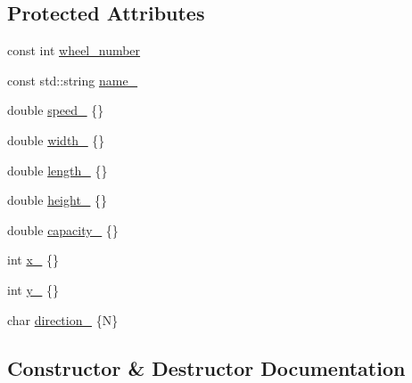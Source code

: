 \subsection*{Protected Attributes}
\begin{DoxyCompactItemize}
\item 
const int \hyperlink{classfp_1_1_land_based_wheeled_ac93d4b44f9091f566ec886ddb9972810}{wheel\+\_\+number}
\item 
const std\+::string \hyperlink{classfp_1_1_land_based_wheeled_a72094d60b6dbfa33b6e5cab4a8e5f7c4}{name\+\_\+}
\item 
double \hyperlink{classfp_1_1_land_based_wheeled_a65bfb90a4e7fe10c87f30d276d9db80c}{speed\+\_\+} \{\}
\item 
double \hyperlink{classfp_1_1_land_based_wheeled_ab36bf6c7c4d986d6e88982b224e1ad1a}{width\+\_\+} \{\}
\item 
double \hyperlink{classfp_1_1_land_based_wheeled_addf50162ea822bf0484978cc08afd07a}{length\+\_\+} \{\}
\item 
double \hyperlink{classfp_1_1_land_based_wheeled_a2a5ae9e9307a22c9538f51ab366d7f57}{height\+\_\+} \{\}
\item 
double \hyperlink{classfp_1_1_land_based_wheeled_abf13221333a556a215b951d45568f03a}{capacity\+\_\+} \{\}
\item 
int \hyperlink{classfp_1_1_land_based_wheeled_a575a73a2601f480d2edbc5daa4cc5bf1}{x\+\_\+} \{\}
\item 
int \hyperlink{classfp_1_1_land_based_wheeled_a5b66ada6988a2b8ce6efafa971dfd9c6}{y\+\_\+} \{\}
\item 
char \hyperlink{classfp_1_1_land_based_wheeled_a71bec8ed4710864eb7a9534b3d39e060}{direction\+\_\+} \{\textquotesingle{}N\textquotesingle{}\}
\end{DoxyCompactItemize}


\subsection{Constructor \& Destructor Documentation}
\mbox{\label{classfp_1_1_land_based_wheeled_a0fe67f1df86ad377e0ef9d64a64f9416}} 
